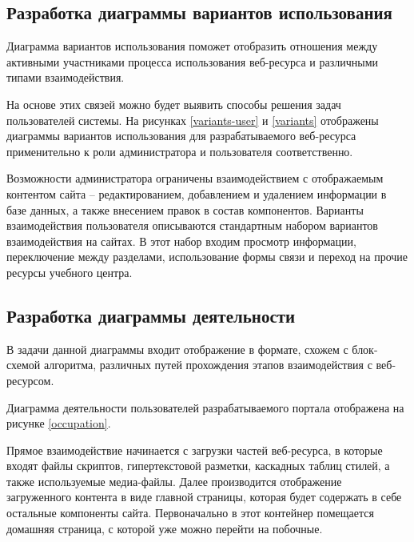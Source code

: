 \subsection{Разработка диаграммы вариантов использования}

Диаграмма вариантов использования поможет отобразить отношения между активными участниками процесса использования веб-ресурса и различными типами взаимодействия.

На основе этих связей можно будет выявить способы решения задач пользователей системы.
На рисунках \ref{variants-user} и \ref{variants} отображены диаграммы вариантов использования для разрабатываемого веб-ресурса применительно к роли администратора и пользователя соответственно.



Возможности администратора ограничены взаимодействием с отображаемым контентом сайта -- редактированием, добавлением и удалением информации в базе данных, а также внесением правок в состав компонентов.
Варианты взаимодействия пользователя описываются стандартным набором вариантов взаимодействия на сайтах.
В этот набор входим просмотр информации, переключение между разделами, использование формы связи и переход на прочие ресурсы учебного центра.

\subsection{Разработка диаграммы деятельности}

В задачи данной диаграммы входит отображение в формате, схожем с блок-схемой алгоритма, различных путей прохождения этапов взаимодействия с веб-ресурсом.

Диаграмма деятельности пользователей разрабатываемого портала отображена на рисунке \ref{occupation}.


Прямое взаимодействие начинается с загрузки частей веб-ресурса, в которые входят файлы скриптов, гипертекстовой разметки, каскадных таблиц стилей, а также используемые медиа-файлы.
Далее производится отображение загруженного контента в виде главной страницы, которая будет содержать в себе остальные компоненты сайта.
Первоначально в этот контейнер помещается домашняя страница, с которой уже можно перейти на побочные.

